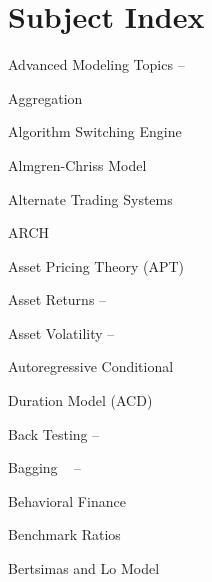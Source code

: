 \chapter*{Subject Index}
\nopagebreak

\setlength\columnsep{0.5cm}
\begin{multicols}{2}
{
\setlength{\parindent}{0em}
\setlength{\parskip}{0em}

Advanced Modeling Topics \hfill \pageref{in:adv_model}--\pageref{in:adv_model_end} \par

Aggregation \hfill \pageref{in:agg} \par

Algorithm Switching Engine \hfill \pageref{in:algo_swit_eng} \par

Almgren-Chriss Model \hfill \pageref{in:alm_chriss} \par

Alternate Trading Systems \hfill \pageref{in:ats} \par

ARCH \hfill \pageref{in:arch} \par

Asset Pricing Theory (APT) \hfill \pageref{in:apt} \par

Asset Returns \hfill \pageref{in:assetret1}--\pageref{in:assetret2} \par

Asset Volatility \hfill \pageref{in:assetvol1}--\pageref{in:assetvol2} \par

Autoregressive Conditional \hfill \pageref{in:acd} \par \hspace{0.25cm} Duration Model (ACD) \par

Back Testing \hfill \pageref{in:back1}--\pageref{in:back2} \par

Bagging \hfill  \pageref{in:bagging}--\pageref{in:bagging_end} \par

Behavioral Finance \hfill \pageref{in:behave1} \par

Benchmark Ratios \hfill \pageref{in:benchmark} \par

Bertsimas and Lo Model \hfill \pageref{in:bert_lo} \par

}
\end{multicols}
